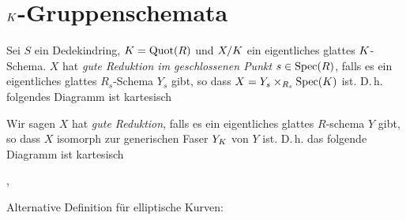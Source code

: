 \documentclass[german]{scrreprt}
\begin{document}
\section{$K$-Gruppenschemata}
\begin{Definition}\label{def:gutereduktion}
  Sei $S$ ein Dedekindring, $K=\operatorname{Quot}(R)$ und $X/K$
  ein eigentliches glattes $K$-Schema.
  $X$ hat \emph{gute Reduktion im geschlossenen Punkt $s\in\operatorname{Spec}(R)$},
  falls es ein eigentliches glattes $R_s$-Schema $Y_s$ gibt, so dass
  $X=Y_s\times_{R_s}\operatorname{Spec}(K)$ ist. D.\,h. folgendes Diagramm ist
  kartesisch
  \begin{center}
  \end{center}
  \cite[vgl.][Chapter 1.4]{neron}

  Wir sagen $X$ hat \emph{gute Reduktion}, falls es ein eigentliches
  glattes $R$-schema $Y$ gibt, so dass $X$ isomorph zur generischen
  Faser $Y_{K}$ von $Y$ ist. D.\,h. das folgende Diagramm ist
  kartesisch
  \begin{center}
  \end{center}
  \cite[Definition 3.1]{goodreduction}, \cite[vgl.][Chapter 1.4]{neron}

  Alternative Definition für elliptische Kurven: \cite[Chapter VII.5]{silverman}
\end{Definition}
\end{document}
